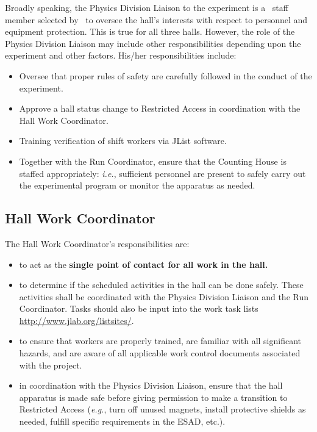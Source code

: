 \documentclass[11pt]{article}
\begin{document}
Broadly speaking, the Physics Division Liaison to the experiment is a \HALL\
staff member selected by  \HALLLEADER ~to oversee the hall's interests with
respect to personnel and equipment protection. 
This is true for all three halls. However, the role of
the Physics Division Liaison may include other responsibilities
depending upon the experiment and other factors. His/her responsibilities
include:
\begin{itemize}
\item Oversee that proper rules of safety are carefully followed in the 
conduct of the experiment.
\item Approve a hall status change to Restricted Access in coordination
with the Hall Work Coordinator.
\item Training verification of shift workers via JList software.
\item Together with the Run Coordinator, 
ensure that the Counting House is staffed appropriately: {\it i.e.},
sufficient personnel are present to safely carry out the experimental 
program or monitor the apparatus as needed.
\end{itemize}  

\subsection{Hall Work Coordinator}

The Hall Work Coordinator's responsibilities are: 

\begin{itemize}

\item  to act as the {\bf single point of contact for all work in the hall.}

\item to determine if the scheduled activities in the hall can be done safely.
These activities shall be coordinated with the Physics Division Liaison
and the Run Coordinator.   Tasks should also be input into the work task
lists \url{http://www.jlab.org/listsites/}.

\item to ensure that workers are properly trained, are familiar with all
significant hazards, and are aware of all applicable work control
documents associated with the project. 

\item in coordination with the Physics Division Liaison, 
ensure that the hall apparatus is made safe before giving permission to
make a transition to Restricted Access ({\it e.g.}, turn off unused magnets,
install protective shields as needed, fulfill specific requirements in the
ESAD, etc.).

 
\end{itemize}
\end{document}
